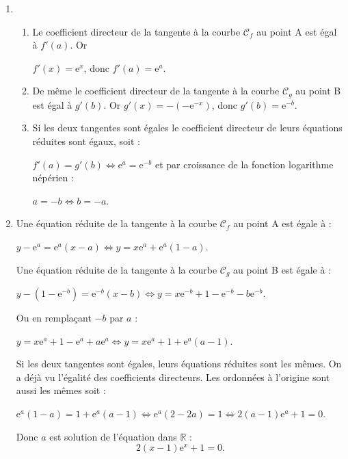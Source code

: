\documentclass[10pt]{article}
\newcommand{\R}{\mathbb{R}}
\begin{document}
\medskip 

%
%
 
\begin{enumerate}
\item 
	\begin{enumerate}
		\item %

Le coefficient directeur de la tangente à la courbe $\mathcal{C}_{f}$ au point A est égal à $f'(a)$. Or

$f'(x)  = \text{e}^{x}$, donc $f'(a) = \text{e}^{a}$. 
		\item %
De même le coefficient directeur de la tangente à la courbe $\mathcal{C}_{g}$ au point B est égal à $g'(b)$. Or $g'(x) = - \left(- \text{e}^{-x}\right)$, donc  $g'(b) = \text{e}^{- b}$.
		\item %
Si les deux tangentes sont égales le coefficient directeur de leurs équations réduites sont égaux, soit :

$f'(a) = g'(b) \iff \text{e}^{a} = \text{e}^{- b}$ et par croissance de la fonction logarithme népérien :

$a = - b \iff b = - a$.
	\end{enumerate} 
\item %

Une équation réduite de la tangente à la courbe $\mathcal{C}_{f}$ au point A est égale à :

$y - \text{e}^a = \text{e}^{a}(x - a) \iff y = x\text{e}^{a} + \text{e}^a(1  - a)$.

Une équation réduite de la tangente à la courbe $\mathcal{C}_{g}$ au point B est égale à :

$y - \left(1 - \text{e}^{- b}\right) = \text{e}^{- b}(x - b) \iff y = x\text{e}^{ - b} + 1 - \text{e}^{- b} - b\text{e}^{- b}$.

Ou en remplaçant $- b$ par $a$ :

$y = x\text{e}^{a} + 1 - \text{e}^{a} + a\text{e}^{a} \iff y = x\text{e}^{a} + 1 + \text{e}^{a}(a - 1)$.

Si les deux tangentes sont égales, leurs équations réduites sont les mêmes. On a déjà vu l'égalité des coefficients directeurs. Les ordonnées à l'origine sont aussi les mêmes soit :

$\text{e}^a(1  - a) = 1 + \text{e}^{a}(a - 1) \iff \text{e}^a(2  - 2a) = 1 \iff 2(a - 1)\text{e}^a + 1 = 0$.

Donc $a$ est solution de l'équation dans $\R$ :
\[2(x - 1)\text{e}^x + 1 = 0.\] 
\end{enumerate} 
\medskip
 
\end{document}
